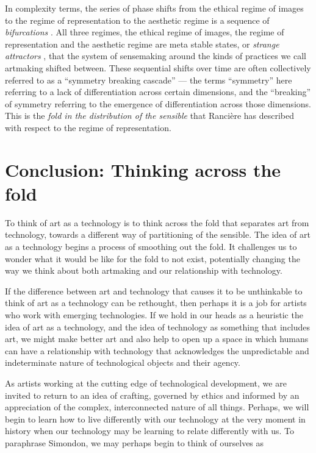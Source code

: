 \documentclass[letterpaper]{article}
\begin{document}
    In complexity terms, the series of phase shifts from the ethical regime of images to the regime of representation to the aesthetic regime is a sequence of \emph{bifurcations} \citep{LandauThryOfPhstrnstns1936}. All three regimes, the ethical regime of images, the regime of representation and the aesthetic regime are meta stable states, or \emph{strange attractors} \citep{RuelleTakensOnThNtrOfTrblnc1971}, that the system of sensemaking around the kinds of practices we call artmaking shifted between. These sequential shifts over time are often collectively referred to as a “symmetry breaking cascade” — the terms “symmetry” here referring to a lack of differentiation across certain dimensions, and the “breaking” of symmetry referring to the emergence of differentiation across those dimensions. This is the \emph{fold in the distribution of the sensible} that Rancière has described with respect to the regime of representation.

\section{Conclusion: Thinking across the fold}

    To think of art as a technology is to think across the fold that separates art from technology, towards a different way of partitioning of the sensible. The idea of art as a technology begins a process of smoothing out the fold. It challenges us to wonder what it would be like for the fold to not exist, potentially changing the way we think about both artmaking and our relationship with technology.
    
    If the difference between art and technology that causes it to be unthinkable to think of art as a technology can be rethought, then perhaps it is a job for artists who work with emerging technologies. If we hold in our heads as a heuristic the idea of art as a technology, and the idea of technology as something that includes art, we might make better art and also help to open up a space in which humans can have a relationship with technology that acknowledges the unpredictable and indeterminate nature of technological objects and their agency.
    
    As artists working at the cutting edge of technological development, we are invited to return to an idea of crafting, governed by ethics and informed by an appreciation of the complex, interconnected nature of all things. Perhaps, we will begin to learn how to live differently with our technology at the very moment in history when our technology may be learning to relate differently with us. To paraphrase Simondon, we may perhaps begin to think of ourselves as
    
\end{document}
